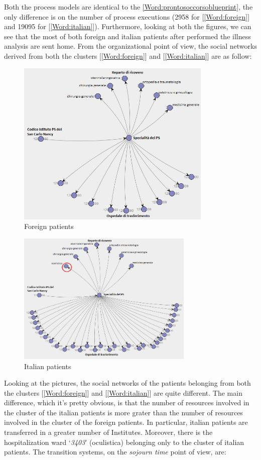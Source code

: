 Both the process models are identical to the \ref{Word:prontosoccorsoblueprint}, the only difference is on the number of process executions (2958 for [\ref{Word:foreign}] and 19095 for [\ref{Word:italian}]). Furthermore, looking at both the figures, we can see that the most of both foreign and italian patients after performed the illness analysis are sent home. From the organizational point of view, the social networks derived from both the clusters [\ref{Word:foreign}] and [\ref{Word:italian}] are as follow:
\begin{figure} [htbp]
\includegraphics[width=0.83\textwidth , keepaspectratio]{ProntoSoccorsoHoWForeigns}
\caption{Foreign patients}
\end{figure}
\clearpage
\noindent
\begin{figure}
\includegraphics[width=0.75\textwidth , keepaspectratio]{ProntoSoccorsoHoWItalians}
\caption{Italian patients}
\end{figure}
Looking at the pictures, the social networks of the patients belonging from both the clusters [\ref{Word:foreign}] and [\ref{Word:italian}] are quite different. The main difference, which it’s pretty obvious, is that the number of resources involved in the cluster of the italian patients is more grater than the number of resources involved in the cluster of the foreign patients. In particular, italian patients are transferred in a greater number of Institutes. Moreover, there is the hospitalization ward `\textit{3403}' (oculistica) belonging only to the cluster of italian patients. The transition systems, on the \textit{sojourn time} point of view, are:

